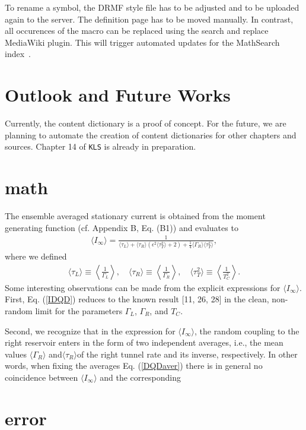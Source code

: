 \documentclass[]{article}
\begin{document}
To rename a symbol, the DRMF style file has to be adjusted and to be uploaded again to the server.
The definition page has to be moved manually. In contrast, all occurences of the macro can be replaced using the search
and replace MediaWiki plugin. This will trigger automated updates for the MathSearch index~.
\section{Outlook and Future Works}
Currently, the content dictionary is a proof of concept.
For the future, we are planning to automate the creation of content dictionaries for other chapters and sources.
Chapter 14 of {\tt KLS} is already in preparation.
\section{math}
    \indent The ensemble averaged stationary current is obtained from the moment generating
function (cf. Appendix B, Eq. (B1)) and evaluates to
\begin{align}\label{IDQD}\tag{38}{
\langle I_\infty \rangle=\frac{1}{\langle \tau_L \rangle+ \langle \tau_R \rangle
\left(\epsilon ^2 \langle \tau_T^2 \rangle+2\right)
    +\tfrac{1}{4}\langle \Gamma_R \rangle \langle \tau_T^2 \rangle},}
\end{align}
where we defined
\begin{align}\label{DQDaver}\tag{39}{
\langle \tau_L \rangle \equiv \left\langle \frac{1}{\Gamma_L}\right\rangle,\quad
\langle \tau_R \rangle \equiv \left\langle \frac{1}{\Gamma_R}\right\rangle,\quad
\langle \tau_T^2 \rangle \equiv \left\langle \frac{1}{T_C^2}\right\rangle.}
\end{align}
Some interesting observations can be made from the explicit expressions for ${\langle
  I_\infty \rangle}$. First, Eq. (\ref{IDQD}) reduces to the known result [11, 26, 28] in the clean,
non-random limit for the parameters ${\Gamma_L}$, ${\Gamma_R}$, and
${T_C}$.


Second, we recognize that in the expression for ${\langle I_\infty \rangle}$, the random
coupling to the right reservoir enters in the form of two independent averages, i.e., the mean
values ${\langle\Gamma_R\rangle}$ and${\langle\tau_R\rangle}$of the right tunnel
rate and its inverse, respectively. In other words, when fixing the averages Eq. (\ref{DQDaver})
there is in general no coincidence between ${\langle I_\infty \rangle}$ and the
corresponding

\section{error}
\end{document}

